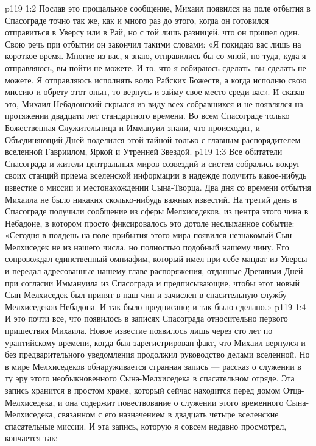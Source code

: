 \vs p119 1:2 Послав это прощальное сообщение, Михаил появился на поле отбытия в Спасограде точно так же, как и много раз до этого, когда он готовился отправиться в Уверсу или в Рай, но с той лишь разницей, что он пришел один. Свою речь при отбытии он закончил такими словами: «Я покидаю вас лишь на короткое время. Многие из вас, я знаю, отправились бы со мной, но туда, куда я отправляюсь, вы пойти не можете. И то, что я собираюсь сделать, вы сделать не можете. Я отправляюсь исполнять волю Райских Божеств, а когда исполню свою миссию и обрету этот опыт, то вернусь и займу свое место среди вас». И сказав это, Михаил Небадонский скрылся из виду всех собравшихся и не появлялся на протяжении двадцати лет стандартного времени. Во всем Спасограде только Божественная Служительница и Иммануил знали, что происходит, и Объединяющий Дней поделился этой тайной только с главным распорядителем вселенной Гавриилом, Яркой и Утренней Звездой.
\vs p119 1:3 Все обитатели Спасограда и жители центральных миров созвездий и систем собрались вокруг своих станций приема вселенской информации в надежде получить какое\hyp{}нибудь известие о миссии и местонахождении Сына\hyp{}Творца. Два дня со времени отбытия Михаила не было никаких сколько\hyp{}нибудь важных известий. На третий день в Спасограде получили сообщение из сферы Мелхиседеков, из центра этого чина в Небадоне, в котором просто фиксировалось это дотоле неслыханное событие: «Сегодня в полдень на поле прибытия этого мира появился незнакомый Сын\hyp{}Мелхиседек не из нашего числа, но полностью подобный нашему чину. Его сопровождал единственный омниафим, который имел при себе мандат из Уверсы и передал адресованные нашему главе распоряжения, отданные Древними Дней при согласии Иммануила из Спасограда и предписывающие, чтобы этот новый Сын\hyp{}Мелхиседек был принят в наш чин и зачислен в спасительную службу Мелхиседеков Небадона. И так было предписано; и так было сделано.»
\vs p119 1:4 И это почти все, что появилось в записях Спасограда относительно первого пришествия Михаила. Новое известие появилось лишь через сто лет по урантийскому времени, когда был зарегистрирован факт, что Михаил вернулся и без предварительного уведомления продолжил руководство делами вселенной. Но в мире Мелхиседеков обнаруживается странная запись --- рассказ о служении в ту эру этого необыкновенного Сына\hyp{}Мелхиседека в спасательном отряде. Эта запись хранится в простом храме, который сейчас находится перед домом Отца\hyp{}Мелхиседека, и она содержит повествование о служении этого временного Сына\hyp{}Мелхиседека, связанном с его назначением в двадцать четыре вселенские спасательные миссии. И эта запись, которую я совсем недавно просмотрел, кончается так:
